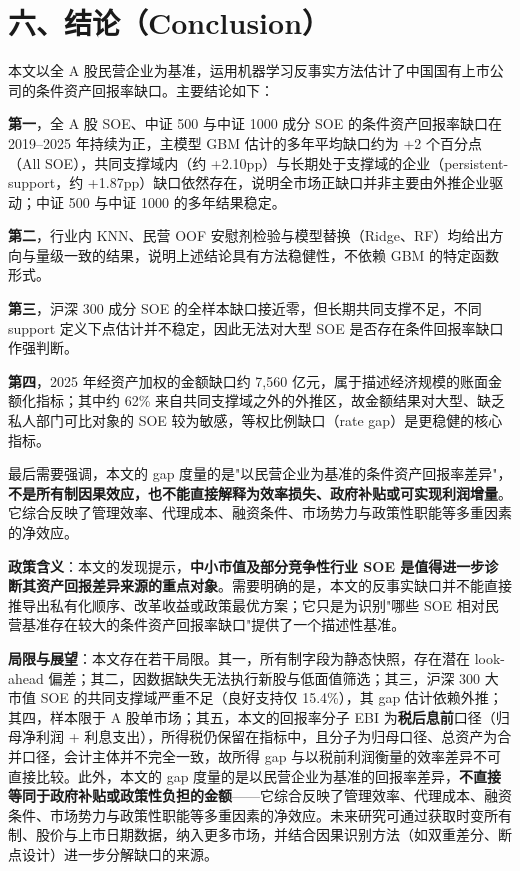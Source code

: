 \documentclass[11pt,a4paper]{ctexart}
\begin{document}
\section{六、结论（Conclusion）}

本文以全 A 股民营企业为基准，运用机器学习反事实方法估计了中国国有上市公司的条件资产回报率缺口。主要结论如下：

\textbf{第一}，全 A 股 SOE、中证 500 与中证 1000 成分 SOE 的条件资产回报率缺口在 2019--2025 年持续为正，主模型 GBM 估计的多年平均缺口约为 +2 个百分点（All SOE），共同支撑域内（约 +2.10pp）与长期处于支撑域的企业（persistent-support，约 +1.87pp）缺口依然存在，说明全市场正缺口并非主要由外推企业驱动；中证 500 与中证 1000 的多年结果稳定。

\textbf{第二}，行业内 KNN、民营 OOF 安慰剂检验与模型替换（Ridge、RF）均给出方向与量级一致的结果，说明上述结论具有方法稳健性，不依赖 GBM 的特定函数形式。

\textbf{第三}，沪深 300 成分 SOE 的全样本缺口接近零，但长期共同支撑不足，不同 support 定义下点估计并不稳定，因此无法对大型 SOE 是否存在条件回报率缺口作强判断。

\textbf{第四}，2025 年经资产加权的金额缺口约 7,560 亿元，属于描述经济规模的账面金额化指标；其中约 62\% 来自共同支撑域之外的外推区，故金额结果对大型、缺乏私人部门可比对象的 SOE 较为敏感，等权比例缺口（rate gap）是更稳健的核心指标。

最后需要强调，本文的 gap 度量的是"以民营企业为基准的条件资产回报率差异"，\textbf{不是所有制因果效应，也不能直接解释为效率损失、政府补贴或可实现利润增量}。它综合反映了管理效率、代理成本、融资条件、市场势力与政策性职能等多重因素的净效应。

\textbf{政策含义}：本文的发现提示，\textbf{中小市值及部分竞争性行业 SOE 是值得进一步诊断其资产回报差异来源的重点对象}。需要明确的是，本文的反事实缺口并不能直接推导出私有化顺序、改革收益或政策最优方案；它只是为识别"哪些 SOE 相对民营基准存在较大的条件资产回报率缺口"提供了一个描述性基准。

\textbf{局限与展望}：本文存在若干局限。其一，所有制字段为静态快照，存在潜在 look-ahead 偏差；其二，因数据缺失无法执行新股与低面值筛选；其三，沪深 300 大市值 SOE 的共同支撑域严重不足（良好支持仅 15.4\%），其 gap 估计依赖外推；其四，样本限于 A 股单市场；其五，本文的回报率分子 EBI 为\textbf{税后息前}口径（归母净利润 + 利息支出），所得税仍保留在指标中，且分子为归母口径、总资产为合并口径，会计主体并不完全一致，故所得 gap 与以税前利润衡量的效率差异不可直接比较。此外，本文的 gap 度量的是以民营企业为基准的回报率差异，\textbf{不直接等同于政府补贴或政策性负担的金额}------它综合反映了管理效率、代理成本、融资条件、市场势力与政策性职能等多重因素的净效应。未来研究可通过获取时变所有制、股价与上市日期数据，纳入更多市场，并结合因果识别方法（如双重差分、断点设计）进一步分解缺口的来源。
\end{document}
